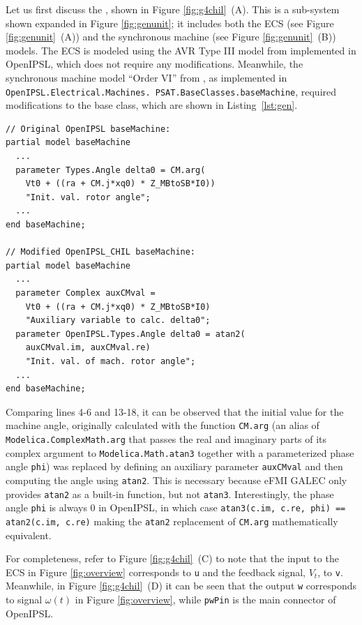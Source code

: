 Let us first discuss the \generatorunit{}, shown in Figure \ref{fig:g4chil}~(A). This is a sub-system shown expanded in Figure \ref{fig:genunit}; it includes both the ECS (see Figure \ref{fig:genunit}~(A)) and the synchronous machine (see Figure \ref{fig:genunit}~(B)) models. The ECS is modeled using the AVR Type III model from \cite{psat} implemented in OpenIPSL, which does not require any modifications. Meanwhile, the synchronous machine model ``Order VI'' from \cite{psat}, as implemented in \texttt{OpenIPSL.Electrical.Machines. PSAT.BaseClasses.baseMachine}, required modifications to the base class, which are shown in Listing~\ref{lst:gen}.

\begin{lstlisting}[language = modelica,
caption={\texttt{baseMachine} modifications for eFMU GALEC code generation.},label={lst:gen}]
// Original OpenIPSL baseMachine:
partial model baseMachine
  ...
  parameter Types.Angle delta0 = CM.arg(
    Vt0 + ((ra + CM.j*xq0) * Z_MBtoSB*I0))
    "Init. val. rotor angle";
  ...
end baseMachine;

// Modified OpenIPSL_CHIL baseMachine:
partial model baseMachine
  ...
  parameter Complex auxCMval =
    Vt0 + ((ra + CM.j*xq0) * Z_MBtoSB*I0)
    "Auxiliary variable to calc. delta0";
  parameter OpenIPSL.Types.Angle delta0 = atan2(
    auxCMval.im, auxCMval.re)
    "Init. val. of mach. rotor angle";
  ...
end baseMachine;
\end{lstlisting}

\noindent{}Comparing lines 4-6 and 13-18, it can be observed that the initial value for the machine angle, originally calculated with the function \texttt{CM.arg} (an alias of \texttt{Modelica.ComplexMath.arg} that passes the real and imaginary parts of its complex argument to \texttt{Modelica.Math.atan3} together with a parameterized phase angle \texttt{phi}) was replaced by defining an auxiliary parameter \texttt{auxCMval} and then computing the angle using \texttt{atan2}. This is necessary because eFMI GALEC only provides \texttt{atan2} as a built-in function, but not \texttt{atan3}. Interestingly, the phase angle \texttt{phi} is always 0 in OpenIPSL, in which case \texttt{atan3(c.im, c.re, phi) == atan2(c.im, c.re)} making the \texttt{atan2} replacement of \texttt{CM.arg} mathematically equivalent.

For completeness, refer to Figure \ref{fig:g4chil}~(C) to note that the input to the ECS in Figure \ref{fig:overview} corresponds to \texttt{u} and the feedback signal, $V_t$, to \texttt{v}. Meanwhile, in Figure \ref{fig:g4chil}~(D) it can be seen that the output \texttt{w} corresponds to signal $\omega(t)$ in Figure \ref{fig:overview}, while \texttt{pwPin} is the main connector of OpenIPSL.

